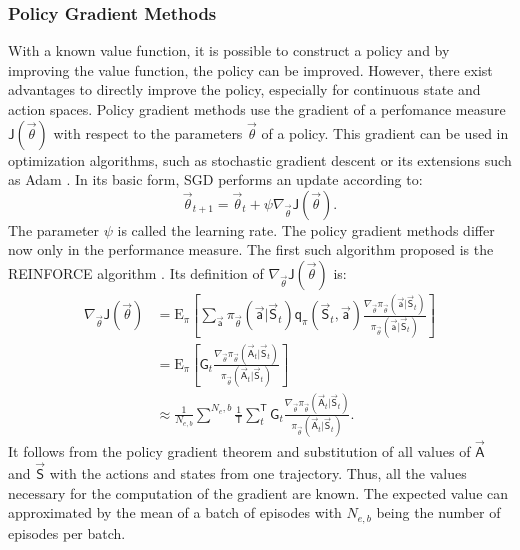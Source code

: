\subsubsection{Policy Gradient Methods}
\label{sec:pgm}
With a known value function, it is possible to construct a policy and by improving the value function, the policy can be improved. However, there exist advantages to directly improve the policy, especially for continuous state and action spaces. Policy gradient methods use the gradient of a perfomance measure $\mathsf{J}(\vec{\theta})$ with respect to the parameters $\vec{\theta}$ of a policy. This gradient can be used in optimization algorithms, such as stochastic gradient descent \cite[p. 201]{sutton_reinforcement_2018} or its extensions such as Adam \cite{kingma_adam_2017}. In its basic form, SGD performs an update according to:
\begin{equation}
\vec{\theta}_{t+1} = \vec{\theta}_t + \psi \nabla_{\vec{\theta}} \mathsf{J}(\vec{\theta}). \label{eq:sgd}
\end{equation}
The parameter $\psi$ is called the learning rate. The policy gradient methods differ now only in the performance measure. The first such algorithm proposed is the REINFORCE algorithm \cite{williams_simple_1992}. Its definition of $\nabla_{\vec{\theta}} \mathsf{J}(\vec{\theta})$ is:
\begin{align}
\nabla_{\vec{\theta}} \mathsf{J}(\vec{\theta})
&= \mathrm{E}_\pi \left[ \sum_{\vec{\mathsf{a}}} \pi_{\vec{\theta}} (\vec{\mathsf{a}}\vert \vec{\mathsf{S}}_t) \mathsf{q}_\pi(\vec{\mathsf{S}}_t, \vec{\mathsf{a}})
\frac{\nabla_{\vec{\theta}} \pi_{\vec{\theta}}(\vec{\mathsf{a}}\vert \vec{\mathsf{S}}_t)}{\pi_{\vec{\theta}}(\vec{\mathsf{a}}\vert \vec{\mathsf{S}}_t)} \right]\label{eq:reinforce} \\
&= \mathrm{E}_\pi \left[\mathsf{G}_t \frac{\nabla_{\vec{\theta}} \pi_{\vec{\theta}}(\vec{\mathsf{A}}_t\vert \vec{\mathsf{S}}_t)}{\pi_{\vec{\theta}}(\vec{\mathsf{A}}_t\vert \vec{\mathsf{S}}_t)} \right] \\
&\approx \frac{1}{N_{e,b}}\sum^{N_e,b} \frac{1}{\mathsf{T}}\sum_t^\mathsf{T} \mathsf{G}_t \frac{\nabla_{\vec{\theta}} \pi_{\vec{\theta}}(\vec{\mathsf{A}}_t\vert \vec{\mathsf{S}}_t)}{\pi_{\vec{\theta}}(\vec{\mathsf{A}}_t\vert \vec{\mathsf{S}}_t)}.
\end{align} It follows from the policy gradient theorem and substitution of all values of $\vec{\mathsf{A}}$ and $\vec{\mathsf{S}}$ with the actions and states from one trajectory. Thus, all the values necessary for the computation of the gradient are known. The expected value can approximated by the mean of a batch of episodes with $N_{e,b}$ being the number of episodes per batch. \cite[p.324-328]{sutton_reinforcement_2018} \\

